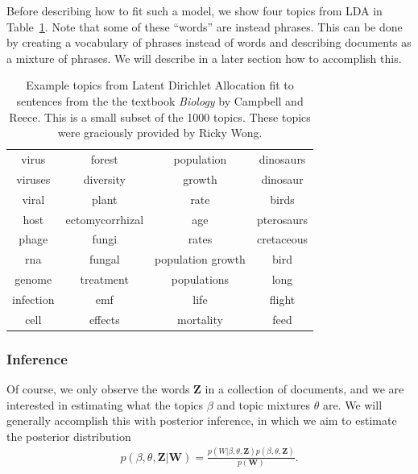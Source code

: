 Before describing how to fit such a model, we show four
topics from LDA in Table~\ref{table:example_lda_topics}.  Note that some
of these ``words'' are instead phrases.  This can be done by creating
a vocabulary of phrases instead of words and describing documents as a
mixture of phrases.  We will describe in a later section how to accomplish
this.
\begin{table}
  \caption{Example topics from Latent Dirichlet Allocation fit to sentences from the the textbook \emph{Biology} by Campbell and Reece.  This is a small subset of the 1000 topics. These topics were graciously provided by Ricky Wong.}
  \center  \begin{tabular}{|c|c|c|c|}
    \hline
    virus & forest & population & dinosaurs \\
    viruses & diversity & growth & dinosaur \\
    viral & plant & rate & birds \\
    host & ectomycorrhizal & age & pterosaurs \\
    phage & fungi & rates & cretaceous \\
    rna & fungal & population growth & bird \\
    genome & treatment & populations & long \\
    infection & emf & life & flight \\
    cell & effects & mortality & feed \\
    \hline
  \end{tabular}
  \label{table:example_lda_topics}
\end{table}

\subsubsection{Inference}
Of course, we only observe the words $\bm Z$ in a collection of
documents, and we are interested in estimating what the topics $\beta$
and topic mixtures $\theta$ are.  We will generally accomplish this
with posterior inference, in which we aim to estimate the posterior
distribution
\begin{align}
  p(\beta, \theta, \bm Z | \bm W) = \frac{p(W | \beta, \theta, \bm Z) p(\beta, \theta, \bm Z)}{p(\bm W)}.
\end{align}

